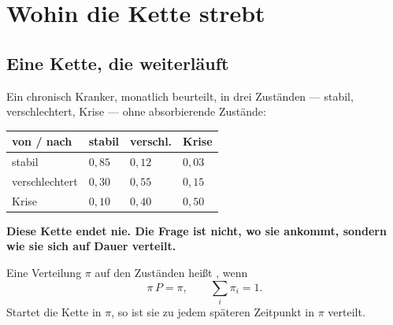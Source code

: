 \chapter{Wohin die Kette strebt}

\section{Eine Kette, die weiterläuft}

\begin{merksatz}
Ein chronisch Kranker, monatlich beurteilt, in drei Zuständen --- stabil, verschlechtert, Krise --- ohne absorbierende Zustände:

\begin{center}
{\small
\renewcommand{\arraystretch}{1.5}
\begin{tabular}{@{}P{2.6cm}P{1.8cm}P{2.0cm}P{1.6cm}@{}}
\toprule
\textbf{von / nach} & \textbf{stabil} & \textbf{verschl.} & \textbf{Krise}\\
\midrule
stabil & $0{,}85$ & $0{,}12$ & $0{,}03$\\
verschlechtert & $0{,}30$ & $0{,}55$ & $0{,}15$\\
Krise & $0{,}10$ & $0{,}40$ & $0{,}50$\\
\bottomrule
\end{tabular}}
\end{center}

\begin{center}
\begin{minipage}{0.9\textwidth}
\textbf{Diese Kette endet nie. Die Frage ist nicht, wo sie ankommt, sondern wie sie sich auf Dauer verteilt.}
\end{minipage}
\end{center}
\end{merksatz}

\begin{definition}
Eine Verteilung $\pi$ auf den Zuständen heißt , wenn
\[ \pi\,P = \pi , \qquad \sum_i \pi_i = 1 . \]
Startet die Kette in $\pi$, so ist sie zu jedem späteren Zeitpunkt in $\pi$ verteilt.
\end{definition}

